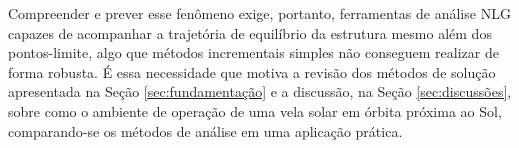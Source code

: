 Compreender e prever esse fenômeno exige, portanto, ferramentas de análise NLG capazes de acompanhar a trajetória de equilíbrio da estrutura mesmo além dos pontos-limite, algo que métodos incrementais simples não conseguem realizar de forma robusta. É essa necessidade que motiva a revisão dos métodos de solução apresentada na Seção \ref{sec:fundamentação} e a discussão, na Seção \ref{sec:discussões}, sobre como o ambiente de operação de uma vela solar em órbita próxima ao Sol, comparando-se os métodos de análise em uma aplicação prática.